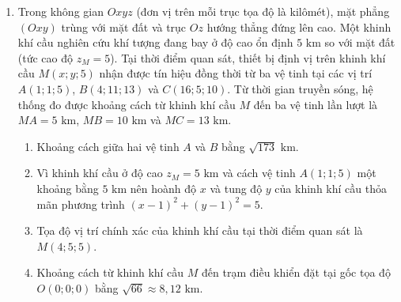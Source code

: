 \documentclass[12pt,a4paper]{article}
\begin{document}
\begin{enumerate}[label=\textbf{Câu \arabic*:}, leftmargin=*]
\item \begin{minipage}[t]{0.55\linewidth}
Trong không gian $Oxyz$ (đơn vị trên mỗi trục tọa độ là kilômét), mặt phẳng $(Oxy)$ trùng với mặt đất và trục $Oz$ hướng thẳng đứng lên cao. Một khinh khí cầu nghiên cứu khí tượng đang bay ở độ cao ổn định $5\text{ km}$ so với mặt đất (tức cao độ $z_M = 5$). Tại thời điểm quan sát, thiết bị định vị trên khinh khí cầu $M(x; y; 5)$ nhận được tín hiệu đồng thời từ ba vệ tinh tại các vị trí $A(1; 1; 5)$, $B(4; 11; 13)$ và $C(16; 5; 10)$. Từ thời gian truyền sóng, hệ thống đo được khoảng cách từ khinh khí cầu $M$ đến ba vệ tinh lần lượt là $MA = 5\text{ km}$, $MB = 10\text{ km}$ và $MC = 13\text{ km}$.
\begin{enumerate}[label=\alph*)]
    \item Khoảng cách giữa hai vệ tinh $A$ và $B$ bằng $\sqrt{173}\text{ km}$.
    \item Vì khinh khí cầu ở độ cao $z_M = 5\text{ km}$ và cách vệ tinh $A(1; 1; 5)$ một khoảng bằng $5\text{ km}$ nên hoành độ $x$ và tung độ $y$ của khinh khí cầu thỏa mãn phương trình $(x - 1)^2 + (y - 1)^2 = 5$.
    \item Tọa độ vị trí chính xác của khinh khí cầu tại thời điểm quan sát là $M(4; 5; 5)$.
    \item Khoảng cách từ khinh khí cầu $M$ đến trạm điều khiển đặt tại gốc tọa độ $O(0; 0; 0)$ bằng $\sqrt{66} \approx 8{,}12\text{ km}$.
\end{enumerate}
\end{minipage}\hfill
\begin{minipage}[t]{0.42\linewidth}
\vspace{-0.4\baselineskip}
\centering
{}
\end{minipage}
\end{enumerate}
\end{document}
